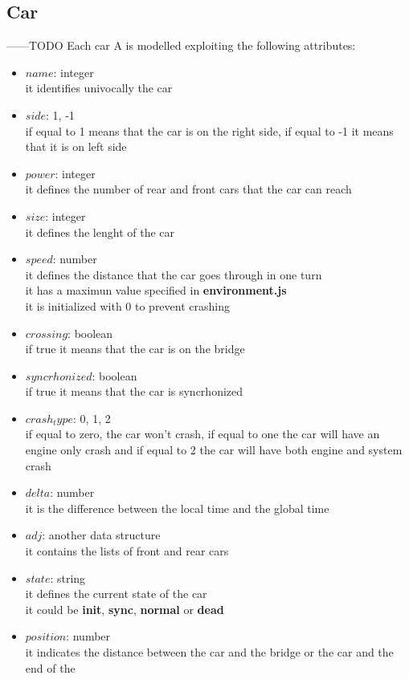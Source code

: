 \subsection{Car}
------TODO
Each car A is modelled exploiting the following attributes:
\begin{itemize}
    \item $name$: integer\\ it identifies univocally the car
    \item $side$: {1, -1}\\ if equal to 1 means that the car is on the right side, 
    if equal to -1 it means that it is on left side
    \item $power$: integer\\ it defines the number of rear and front cars that the car can reach
    \item $size$: integer \\ it defines the lenght of the car
    \item $speed$: number\\ it defines the distance that the car goes through in one turn\\
    it has a maximun value specified in \textbf{environment.js}\\
    it is initialized with 0 to prevent crashing 
    \item $crossing$: boolean\\ if true it means that the car is on the bridge
    \item $syncrhonized$: boolean\\ if true it means that the car is syncrhonized    
    \item $crash_type$: {0, 1, 2}\\ if equal to zero, the car won't crash, if equal to one the car will have an engine only crash
    and if equal to 2 the car will have both engine and system crash 
    \item $delta$: number\\ it is the difference between the local time and the global time
    \item $adj$: another data structure\\ it contains the lists of front and rear cars
    \item $state$: string\\ it defines the current state of the car\\ it could be \textbf{init}, \textbf{sync}, \textbf{normal} or \textbf{dead}
    \item $position$: number \\it indicates the distance between the car and the bridge or the car and the end of the

\end{itemize}
